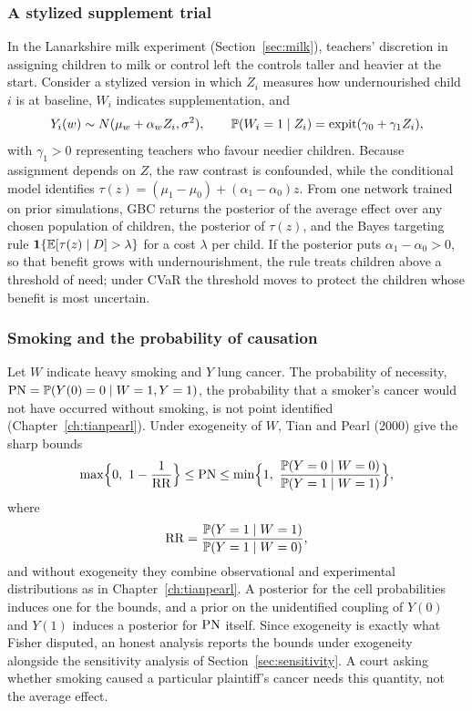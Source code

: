\subsubsection{A stylized supplement trial}

In the Lanarkshire milk experiment (Section~\ref{sec:milk}), teachers' discretion in assigning children to milk or control left the controls taller and heavier at the start. Consider a stylized version in which $Z_i$ measures how undernourished child $i$ is at baseline, $W_i$ indicates supplementation, and
\[
Y_i(w) \sim N(\mu_w + \alpha_w Z_i, \sigma^2),\qquad \mathbb{P}(W_i=1\mid Z_i) = \operatorname{expit}(\gamma_0 + \gamma_1 Z_i),
\]
with $\gamma_1>0$ representing teachers who favour needier children. Because assignment depends on $Z$, the raw contrast is confounded, while the conditional model identifies $\tau(z) = (\mu_1-\mu_0) + (\alpha_1-\alpha_0)z$. From one network trained on prior simulations, GBC returns the posterior of the average effect over any chosen population of children, the posterior of $\tau(z)$, and the Bayes targeting rule $\mathbf{1}\{\mathbb{E}[\tau(z)\mid D] > \lambda\}$ for a cost $\lambda$ per child. If the posterior puts $\alpha_1-\alpha_0>0$, so that benefit grows with undernourishment, the rule treats children above a threshold of need; under CVaR the threshold moves to protect the children whose benefit is most uncertain. 

\subsubsection{Smoking and the probability of causation}

Let $W$ indicate heavy smoking and $Y$ lung cancer. The probability of necessity, $\mathrm{PN} = \mathbb{P}(Y(0)=0\mid W=1, Y=1)$, the probability that a smoker's cancer would not have occurred without smoking, is not point identified (Chapter~\ref{ch:tianpearl}). Under exogeneity of $W$, Tian and Pearl (2000) give the sharp bounds
\[
\max\Bigl\{0,\ 1 - \frac{1}{\mathrm{RR}}\Bigr\} \le \mathrm{PN} \le \min\Bigl\{1,\ \frac{\mathbb{P}(Y=0\mid W=0)}{\mathbb{P}(Y=1\mid W=1)}\Bigr\},
\]
where
\[
\mathrm{RR} = \frac{\mathbb{P}(Y=1\mid W=1)}{\mathbb{P}(Y=1\mid W=0)},
\]
and without exogeneity they combine observational and experimental distributions as in Chapter~\ref{ch:tianpearl}. A posterior for the cell probabilities induces one for the bounds, and a prior on the unidentified coupling of $Y(0)$ and $Y(1)$ induces a posterior for $\mathrm{PN}$ itself. Since exogeneity is exactly what Fisher disputed, an honest analysis reports the bounds under exogeneity alongside the sensitivity analysis of Section~\ref{sec:sensitivity}. A court asking whether smoking caused a particular plaintiff's cancer needs this quantity, not the average effect.

